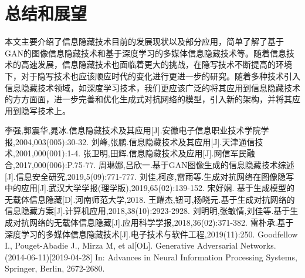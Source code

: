     \section{总结和展望}
    本文主要介绍了信息隐藏技术目前的发展现状以及部分应用，简单了解了基于GAN的图像信息隐藏技术和基于深度学习的多媒体信息隐藏技术等。随着信息技术的高速发展，信息隐藏技术也面临着更大的挑战，在隐写技术不断提高的环境下，对于隐写技术也应该顺应时代的变化进行更进一步的研究。随着多种技术引入信息隐藏技术领域，如深度学习技术，我们更应该广泛的将其应用到信息隐藏技术的方方面面，进一步完善和优化生成式对抗网络的模型，引入新的架构，并将其应用到隐写技术上。
    \clearpage%
    \begin{thebibliography}{10}%
	李强,郭震华,晁冰.信息隐藏技术及其应用[J].安徽电子信息职业技术学院学报,2004,003(005):30-32.
	刘峰,张鹏.信息隐藏技术及其应用[J].天津通信技术,2001,000(001):1-4.
	张卫明,田辉.信息隐藏技术及应用[J].网信军民融合,2017,000(006):P.75-77.
	周琳娜,吕欣一.基于GAN图像生成的信息隐藏技术综述[J].信息安全研究,2019,5(09):771-777.
	刘佳,柯彦,雷雨等.生成对抗网络在图像隐写中的应用[J].武汉大学学报(理学版),2019,65(02):139-152.
	宋好娴. 基于生成模型的无载体信息隐藏[D].河南师范大学,2018.
	王耀杰,钮可,杨晓元.基于生成对抗网络的信息隐藏方案[J].计算机应用,2018,38(10):2923-2928.
	刘明明,张敏情,刘佳等.基于生成对抗网络的无载体信息隐藏[J].应用科学学报,2018,36(02):371-382.
	雷朴承.基于深度学习的多媒体信息隐藏技术[J].电子技术与软件工程,2019(11):250.
	Goodfellow I., Pouget-Abadie J., Mirza M, et al[OL]. Generative Adversarial Networks. (2014-06-11)[2019-04-28] In: Advances in Neural Information Processing Systems, Springer, Berlin, 2672-2680.
    \end{thebibliography}    
 